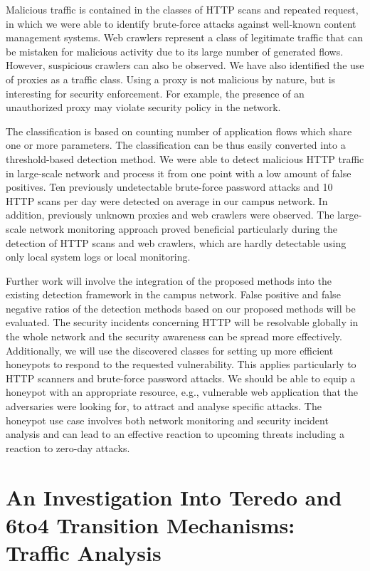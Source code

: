 Malicious traffic is contained in the classes of HTTP scans and repeated request, in which we were able to identify brute-force attacks against well-known content management systems. Web crawlers represent a class of legitimate traffic that can be mistaken for malicious activity due to its large number of generated flows. However, suspicious crawlers can also be observed. We have also identified the use of proxies as a traffic class. Using a proxy is not malicious by nature, but is interesting for security enforcement. For example, the presence of an unauthorized proxy may violate security policy in the network.

The classification is based on counting number of application flows which share one or more parameters. The classification can be thus easily converted into a threshold-based detection method. 
We were able to detect malicious HTTP traffic in large-scale network and process it from one point with a low amount of false positives. Ten previously undetectable brute-force password attacks and 10 HTTP scans per day were detected on average in our campus network. In addition, previously unknown proxies and web crawlers were observed. 
The large-scale network monitoring approach proved beneficial particularly during the detection of HTTP scans and web crawlers, which are hardly detectable using only local system logs or local monitoring.

Further work will involve the integration of the proposed methods into the existing detection framework in the campus network. False positive and false negative ratios of the detection methods based on our proposed methods will be evaluated. The security incidents concerning HTTP will be resolvable globally in the whole network and the security awareness can be spread more effectively. 
Additionally, we will use the discovered classes for setting up more efficient honeypots to respond to the requested vulnerability. This applies particularly to HTTP scanners and brute-force password attacks. We should be able to equip a honeypot with an appropriate resource, e.g., vulnerable web application that the adversaries were looking for, to attract and analyse specific attacks. 
The honeypot use case involves both network monitoring and security incident analysis and can lead to an effective reaction to upcoming threats including a reaction to zero-day attacks.


\section{An Investigation Into Teredo and 6to4 Transition Mechanisms: Traffic Analysis}\label{sec:analysis-ipv6-transition}

